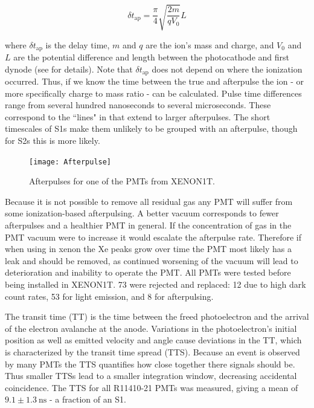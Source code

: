 \begin{equation}
\delta t_{\mathrm{ap}} = \frac{\pi}{4} \sqrt{\frac{2 m}{q V_{0}}} L
\end{equation}

where $\delta t_{\mathrm{ap}}$ is the delay time, $m$ and $q$ are the ion's mass and charge, and $V_{0}$ and $L$ are the potential
difference and length between the photocathode and first dynode (see  for details).  Note that $\delta t_{\mathrm{ap}}$
does not depend on where the ionization occurred.  Thus, if we know the time between the true and afterpulse the ion - or more specifically
charge to mass ratio - can be calculated.  Pulse time differences range from several hundred nanoseconds to several microseconds.  These
correspond to the ``lines" in  that extend to larger afterpulses.  The short timescales of S1s make them
unlikely to be grouped with an afterpulse, though for S2s this is more likely.

\begin{figure}
\centering
\texttt{[image: Afterpulse]}
\caption{Afterpulses for one of the PMTs from XENON1T.}
\label{fig:xenon1t_pmts_ap}
\end{figure}

Because it is not possible to remove all residual gas any PMT will suffer from some ionization-based afterpulsing.  A better vacuum
corresponds to fewer afterpulses and a healthier PMT in general.  If the concentration of gas in the PMT vacuum were to increase it would
escalate the afterpulse rate.  Therefore if when using in xenon the Xe peaks grow over time the PMT most likely has a leak and should
be removed, as continued worsening of the vacuum will lead to deterioration and inability to operate the PMT.  All PMTs were tested before
being installed in XENON1T.  73 were rejected and replaced: 12 due to high dark count rates, 53 for light emission, and 8 for
afterpulsing.

The transit time (TT) is the time between the freed photoelectron and the arrival of the electron avalanche at the anode.  Variations in
the photoelectron's initial position as well as emitted velocity and angle cause deviations in the TT, which is characterized by the
transit time spread (TTS).  Because an event is observed by many PMTs the TTS quantifies how close together there signals should be.  Thus
smaller TTSs lead to a smaller integration window, decreasing accidental coincidence.  The TTS for all R11410-21 PMTs was measured, giving
a mean of $9.1 \pm 1.3\ \mathrm{ns}$ - a fraction of an S1.


